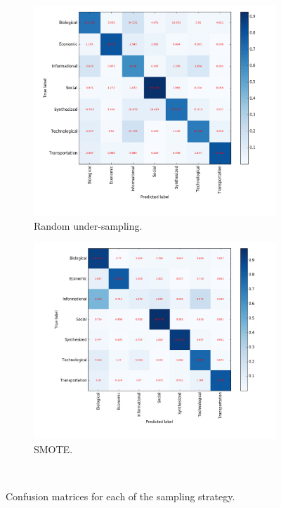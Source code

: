 \documentclass{article}
\begin{document}
\begin{figure}[H]
\medskip
\begin{subfigure}{0.48\textwidth}
\includegraphics[width=\linewidth]{figs/similarity/Domain/RandomUnder_26/confusion.png}
\caption{Random under-sampling.} \label{random_under_confusion}
\end{subfigure}\hspace*{\fill}
\begin{subfigure}{0.48\textwidth}
\includegraphics[width=\linewidth]{figs/similarity/Domain/SMOTE/confusion.png}
\caption{SMOTE.} \label{somte_confusion}
\end{subfigure}
\
\caption{Confusion matrices for each of the sampling strategy.} \label{confusion}
\end{figure}


\clearpage


 
\end{document}
